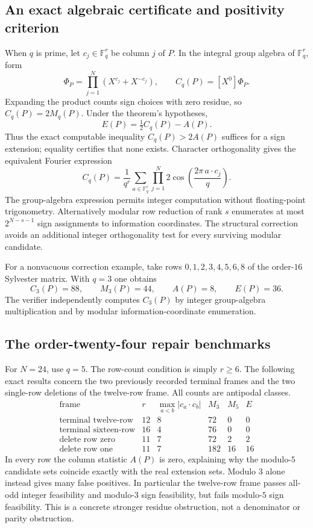 \subsection{An exact algebraic certificate and positivity criterion}
When $q$ is prime, let $c_j\in\mathbb F_q^r$ be column $j$ of $P$.
In the integral group algebra of $\mathbb F_q^r$, form
\[
 \Phi_P=\prod_{j=1}^N(X^{c_j}+X^{-c_j}),\qquad
 C_q(P)=[X^0]\Phi_P.
\]
Expanding the product counts sign choices with zero residue, so
$C_q(P)=2M_q(P)$. Under the theorem's hypotheses,
\[
 \boxed{E(P)=\tfrac12 C_q(P)-A(P).}
\]
Thus the exact computable inequality $C_q(P)>2A(P)$ suffices for a
sign extension; equality certifies that none exists. Character
orthogonality gives the equivalent Fourier expression
\[
 C_q(P)=\frac1{q^r}\sum_{a\in\mathbb F_q^r}
          \prod_{j=1}^N2\cos\left(\frac{2\pi\,a\cdot c_j}{q}\right).
\]
The group-algebra expression permits integer computation without
floating-point trigonometry. Alternatively modular row reduction of
rank $s$ enumerates at most $2^{N-s-1}$ sign assignments to information
coordinates. The structural correction avoids an additional integer
orthogonality test for every surviving modular candidate.

For a nonvacuous correction example, take rows $0,1,2,3,4,5,6,8$ of
the order-$16$ Sylvester matrix. With $q=3$ one obtains
\[
 C_3(P)=88,\qquad M_3(P)=44,\qquad A(P)=8,\qquad E(P)=36.
\]
The verifier independently computes $C_3(P)$ by integer group-algebra
multiplication and by modular information-coordinate enumeration.

\subsection{The order-twenty-four repair benchmarks}
For $N=24$, use $q=5$. The row-count condition is simply $r\ge6$.
The following exact results concern the two previously recorded
terminal frames and the two single-row deletions of the twelve-row
frame. All counts are antipodal classes.
\[
\begin{array}{c|r|r|r|r|r}
\text{frame}&r&\max_{a<b}|c_a\cdot c_b|&M_3&M_5&E\\\hline
\text{terminal twelve-row}&12&8&72&0&0\\
\text{terminal sixteen-row}&16&4&76&0&0\\
\text{delete row zero}&11&7&72&2&2\\
\text{delete row one}&11&7&182&16&16
\end{array}
\]
In every row the column statistic $A(P)$ is zero, explaining why the
modulo-$5$ candidate sets coincide exactly with the real extension
sets. Modulo $3$ alone instead gives many false positives. In
particular the twelve-row frame passes all-odd integer feasibility
and modulo-$3$ sign feasibility, but fails modulo-$5$ sign feasibility.
This is a concrete stronger residue obstruction, not a denominator
or parity obstruction.

